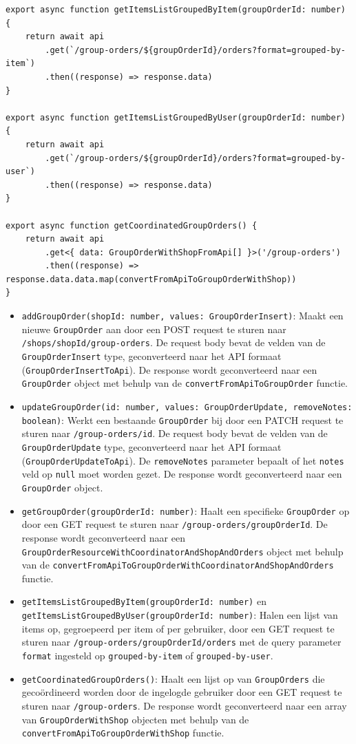 \begin{verbatim}
export async function getItemsListGroupedByItem(groupOrderId: number) {
    return await api
        .get(`/group-orders/${groupOrderId}/orders?format=grouped-by-item`)
        .then((response) => response.data)
}

export async function getItemsListGroupedByUser(groupOrderId: number) {
    return await api
        .get(`/group-orders/${groupOrderId}/orders?format=grouped-by-user`)
        .then((response) => response.data)
}

export async function getCoordinatedGroupOrders() {
    return await api
        .get<{ data: GroupOrderWithShopFromApi[] }>('/group-orders')
        .then((response) => response.data.data.map(convertFromApiToGroupOrderWithShop))
}
\end{verbatim}
\label{lst:grouporderservicets}

\begin{itemize}
  \item \texttt{addGroupOrder(shopId: number, values: GroupOrderInsert)}: Maakt een nieuwe \texttt{GroupOrder} aan door een POST request te sturen naar \texttt{/shops/{shopId}/group-orders}. De request body bevat de velden van de \texttt{GroupOrderInsert} type, geconverteerd naar het API formaat (\texttt{GroupOrderInsertToApi}). De response wordt geconverteerd naar een \texttt{GroupOrder} object met behulp van de \texttt{convertFromApiToGroupOrder} functie.
  \item \texttt{updateGroupOrder(id: number, values: GroupOrderUpdate, removeNotes: boolean)}: Werkt een bestaande \texttt{GroupOrder} bij door een PATCH request te sturen naar \texttt{/group-orders/{id}}. De request body bevat de velden van de \texttt{GroupOrderUpdate} type, geconverteerd naar het API formaat (\texttt{GroupOrderUpdateToApi}). De \texttt{removeNotes} parameter bepaalt of het \texttt{notes} veld op \texttt{null} moet worden gezet. De response wordt geconverteerd naar een \texttt{GroupOrder} object.
  \item \texttt{getGroupOrder(groupOrderId: number)}: Haalt een specifieke \texttt{GroupOrder} op door een GET request te sturen naar \texttt{/group-orders/{groupOrderId}}. De response wordt geconverteerd naar een \texttt{GroupOrderResourceWithCoordinatorAndShopAndOrders} object met behulp van de \texttt{convertFromApiToGroupOrderWithCoordinatorAndShopAndOrders} functie.
  \item \texttt{getItemsListGroupedByItem(groupOrderId: number)} en \texttt{getItemsListGroupedByUser(groupOrderId: number)}: Halen een lijst van items op, gegroepeerd per item of per gebruiker, door een GET request te sturen naar \texttt{/group-orders/{groupOrderId}/orders} met de query parameter \texttt{format} ingesteld op \texttt{grouped-by-item} of \texttt{grouped-by-user}.
  \item \texttt{getCoordinatedGroupOrders()}: Haalt een lijst op van \texttt{GroupOrders} die gecoördineerd worden door de ingelogde gebruiker door een GET request te sturen naar \texttt{/group-orders}. De response wordt geconverteerd naar een array van \texttt{GroupOrderWithShop} objecten met behulp van de \texttt{convertFromApiToGroupOrderWithShop} functie.
\end{itemize}

